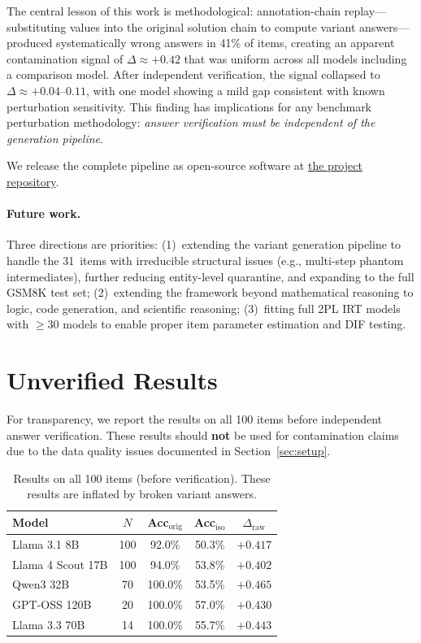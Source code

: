 \documentclass[11pt,a4paper]{article}
\begin{document}
The central lesson of this work is methodological: annotation-chain
replay---substituting values into the original solution chain to compute
variant answers---produced systematically wrong answers in 41\% of
items, creating an apparent contamination signal of
$\Delta \approx +0.42$ that was uniform across all models including a
comparison model. After independent verification, the signal collapsed
to $\Delta \approx +0.04$--$0.11$, with one model showing a mild gap
consistent with known perturbation sensitivity. This finding
has implications for any benchmark perturbation methodology:
\emph{answer verification must be independent of the generation
pipeline}.

We release the complete pipeline as open-source software at
\href{https://github.com/testofschool/isomorph-eval}{the project repository}.

\paragraph{Future work.}
Three directions are priorities: (1)~extending the variant generation
pipeline to handle the 31~items with irreducible structural issues
(e.g., multi-step phantom intermediates), further reducing entity-level
quarantine, and expanding to the full
GSM8K test set; (2)~extending the framework beyond mathematical
reasoning to logic, code generation, and scientific reasoning;
(3)~fitting full 2PL IRT models with $\geq 30$ models to enable
proper item parameter estimation and DIF testing.




\appendix
\section{Unverified Results}
\label{app:unverified}

For transparency, we report the results on all 100 items before
independent answer verification. These results should \textbf{not} be
used for contamination claims due to the data quality issues documented
in Section~\ref{sec:setup}.

\begin{table}[h]
\centering
\small
\caption{Results on all 100 items (before verification). These results are inflated by broken variant answers.}
\begin{tabular}{lcccc}
\toprule
Model & $N$ & Acc$_{\mathrm{orig}}$ & Acc$_{\mathrm{iso}}$ & $\Delta_{\mathrm{raw}}$ \\
\midrule
Llama 3.1 8B & 100 & 92.0\% & 50.3\% & $+0.417$ \\
Llama 4 Scout 17B & 100 & 94.0\% & 53.8\% & $+0.402$ \\
Qwen3 32B & 70 & 100.0\% & 53.5\% & $+0.465$ \\
GPT-OSS 120B & 20 & 100.0\% & 57.0\% & $+0.430$ \\
Llama 3.3 70B & 14 & 100.0\% & 55.7\% & $+0.443$ \\
\bottomrule
\end{tabular}
\end{table}
\end{document}
